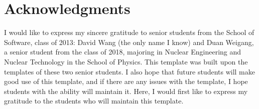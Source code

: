 \documentclass[
reprint,
superscriptaddress,
nofootinbib,
amsmath,amssymb,
aps,
prd,
]{revtex4-2}
\begin{document}
\section{Acknowledgments}
I would like to express my sincere gratitude to senior students from the School of Software, class of 2013: David Wang (the only name I know) and Duan Weigang, a senior student from the class of 2018, majoring in Nuclear Engineering and Nuclear Technology in the School of Physics. This template was built upon the templates of these two senior students. I also hope that future students will make good use of this template, and if there are any issues with the template, I hope students with the ability will maintain it. Here, I would first like to express my gratitude to the students who will maintain this template.




\nocite{*}

\end{document}
